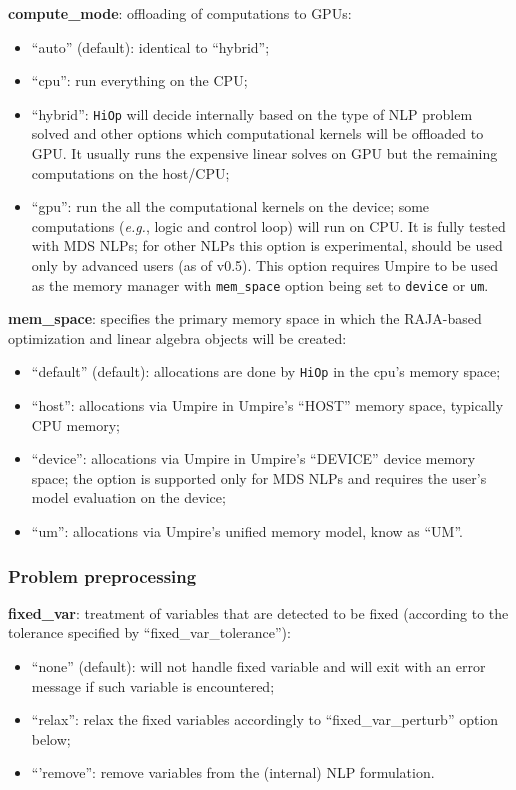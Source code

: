 \documentclass[11pt]{article}
\newcounter{line}
\newcommand{\Hi}{\texttt{HiOp}\xspace}
\begin{document}
\medskip

\noindent \textbf{compute\_mode}: offloading of computations to GPUs:
\begin{itemize}
\item ``auto'' (default): identical to ``hybrid'';
\item ``cpu'': run everything on the CPU;
\item ``hybrid'':  \Hi will decide internally based on the type of NLP problem solved and other options which computational kernels will be offloaded to GPU. It usually runs the expensive linear solves on GPU but the remaining computations on the host/CPU;
\item ``gpu'': run the all the computational kernels on the device; some computations (\textit{e.g.}, logic and control loop) will run on CPU. It is fully tested with MDS NLPs; for other NLPs this option is experimental, should be used only by advanced users (as of v0.5). This option requires Umpire to be used as the memory manager with \texttt{mem\_space} option being set to \texttt{device} or \texttt{um}.
\end{itemize}

\medskip


\noindent \textbf{mem\_space}: specifies the primary memory space in which the RAJA-based optimization and linear algebra objects will be created:
\begin{itemize}
\item ``default'' (default): allocations are done by \Hi in the cpu's memory space;
\item ``host'':  allocations via Umpire in Umpire's ``HOST'' memory space, typically CPU memory;
\item ``device'': allocations via Umpire in Umpire's ``DEVICE'' device memory space; the option is supported only for MDS NLPs and requires the user's model evaluation on the device;
\item ``um'': allocations via Umpire's unified memory model, know as ``UM''.
\end{itemize}

\medskip

\subsubsection{Problem preprocessing}


\noindent \textbf{fixed\_var}: treatment of  variables that are detected to be fixed (according to the tolerance specified by ``fixed\_var\_tolerance''):
\begin{itemize}
\item ``none'' (default): will not handle fixed variable and will exit with an error message if such variable is encountered;
\item ``relax'':  relax the fixed variables accordingly to ``fixed\_var\_perturb'' option below;
\item ``'remove'': remove variables from the (internal) NLP formulation.
\end{itemize}
\end{document}
